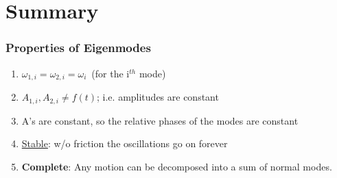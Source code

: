 \documentclass[pdf,hideothersubsections]{beamer}
\begin{document}




\section{Summary}
\begin{frame}
\frametitle{Properties of Eigenmodes}
\begin{enumerate}
\pause
\item $\omega_{1,i}=\omega_{2,i}=\omega_i$~(for the i$^{th}$ mode)
\pause
\item $A_{1,i}, A_{2,i} \ne f(t)$; i.e. amplitudes are constant
\pause
\item A's are constant, so the relative phases of the modes are
  constant
\pause
\item \underline{Stable}: w/o friction the oscillations go on forever
\pause
\item \textbf{Complete}: Any motion can be decomposed into a sum of
  normal modes.

\end{enumerate}
\end{frame}
\end{document}
